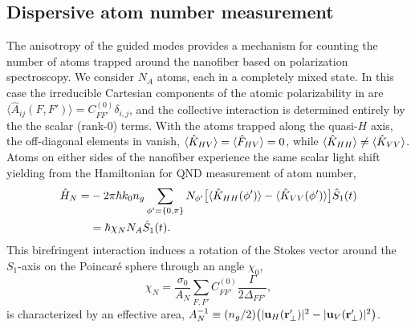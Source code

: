 \documentclass[preprint,aps,pra,onecolumn]{revtex4-1} %
\newcommand{\inp}{{\rm in}}
\newcommand{\polterm}{\hat{F}}
\newcommand{\Abiref}{A_{\rm bir}}
\newcommand{\comment}[1]{{\color{Maroon} #1}}
\begin{document}
	\subsection{Dispersive atom number measurement} \label{Sec::AtomNumberMeasurement}

The anisotropy of the guided modes provides a mechanism for counting the number of atoms trapped around the nanofiber based on polarization spectroscopy.  We consider $N_A$ atoms, each in a completely mixed state. In this case the irreducible Cartesian components of the atomic polarizability in  are $\langle \hat{A}_{ij}(F,F') \rangle = C_{FF'}^{(0)} \delta_{i,j}$, and the collective interaction is determined entirely by the the scalar (rank-0) terms.  With the atoms trapped along the quasi-$H$ axis, the off-diagonal elements in  vanish, $\expt{ \hat{K}_{HV} } = \expt{ \polterm_{HV} } =0$, while $\langle{ \hat{K}_{HH} }\rangle \neq  \langle{ \hat{K}_{VV} }\rangle$.  Atoms on either sides of the nanofiber experience the same scalar light shift yielding from   the Hamiltonian for QND measurement of atom number,
	\begin{align}
		\hat{H}_{N} =& -2\pi \hbar k_0 n_g \sum_{\phi' = \{0,\pi \}} N_{\phi'} \big[ \langle{ \hat{K}_{HH}(\phi')}\rangle  - \langle{ \hat{K}_{VV}(\phi')}\rangle \big] \hat{S}_1(t)  \nonumber \\
		& =  \hbar \chi_N N_A \hat{S}_1(t).  \label{Eq::MixedHamiltonian}
	\end{align}	
This birefringent interaction induces a rotation of the Stokes vector  around the $S_1$-axis on the Poincar\'{e} sphere through an angle $\chi_0$, 
	\begin{equation} \label{Eq::RotationAngle}
		\chi_N = \frac{\sigma_0}{A_N}  \sum_{F,F'}  C_{FF'}^{(0)} \frac{\Gamma}{2 \Delta_{FF'}},
	\end{equation}
is characterized by an effective area, $A_N^{-1} \equiv (n_g/2) \big( |\mathbf{u}_{H}(\mathbf{r}'_\perp)|^2 - |\mathbf{u}_{V}(\mathbf{r}'_\perp)| ^2 \big)$.   %
\end{document}
